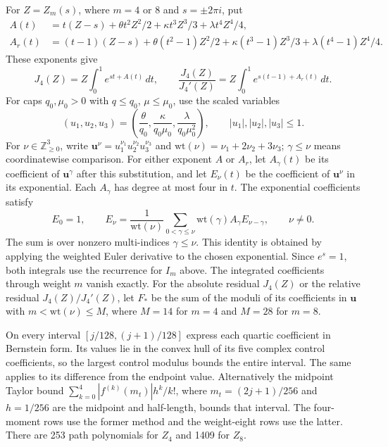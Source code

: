 For $Z=Z_m(s)$, where $m=4$ or $8$ and $s=\pm2\pi i$, put
\begin{align*}
 A(t)&=t(Z-s)+\theta t^2 Z^2/2+\kappa t^3Z^3/3+\lambda t^4Z^4/4,\\
 A_r(t)&=(t-1)(Z-s)+\theta(t^2-1)Z^2/2
                  +\kappa(t^3-1)Z^3/3+\lambda(t^4-1)Z^4/4.
\end{align*}
These exponents give
\[
 J_4(Z)=Z\int_0^1e^{st+A(t)}\,dt,\qquad
 \frac{J_4(Z)}{J_4'(Z)}
 =Z\int_0^1e^{s(t-1)+A_r(t)}\,dt.
\]
For caps $q_0,\mu_0>0$ with $q\le q_0$, $\mu\le\mu_0$, use
the scaled variables
\[
 (u_1,u_2,u_3)=
 \left(\frac{\theta}{q_0},\frac{\kappa}{q_0\mu_0},
                         \frac{\lambda}{q_0\mu_0^2}\right),
 \qquad |u_1|,|u_2|,|u_3|\le1.
\]
For $\nu\in\mathbb Z_{\ge0}^3$, write
$\mathbf u^\nu=u_1^{\nu_1}u_2^{\nu_2}u_3^{\nu_3}$ and
$\mathrm{wt}(\nu)=\nu_1+2\nu_2+3\nu_3$; $\gamma\le\nu$ means
coordinatewise comparison. For either exponent $A$ or $A_r$, let
$A_\gamma(t)$ be its coefficient of $\mathbf u^\gamma$ after this
substitution, and let $E_\nu(t)$ be the coefficient of $\mathbf u^\nu$
in its exponential. Each $A_\gamma$ has degree at most four in $t$.
The exponential coefficients satisfy
\begin{equation}\label{lt:euler-recursion}
 E_0=1,\qquad
 E_\nu=\frac1{\mathrm{wt}(\nu)}
       \sum_{0<\gamma\le\nu}\mathrm{wt}(\gamma)A_\gamma E_{\nu-\gamma},
 \qquad \nu\ne0.
\end{equation}
The sum is over nonzero multi-indices $\gamma\le\nu$.
This identity is obtained by applying the weighted Euler derivative to
the chosen exponential. Since $e^s=1$, both integrals use the recurrence
for $I_m$ above. The integrated coefficients through weight $m$ vanish
exactly.
For the absolute residual $J_4(Z)$ or the relative residual
$J_4(Z)/J_4'(Z)$, let $F_*$ be the sum of the moduli of its
coefficients in $\mathbf u$ with $m<\mathrm{wt}(\nu)\le M$,
where $M=14$ for $m=4$ and $M=28$ for $m=8$.

On every interval
$[j/128,(j+1)/128]$ express each quartic coefficient in Bernstein
form. Its values lie in the convex hull of its five complex control
coefficients, so the largest control modulus bounds the entire
interval. The same applies to its difference from the endpoint value.
Alternatively the midpoint Taylor bound
$\sum_{k=0}^4|f^{(k)}(m_t)|h^k/k!$, where
$m_t=(2j+1)/256$ and $h=1/256$ are the midpoint and half-length,
bounds that interval. The four-moment rows use the former method and the
weight-eight rows use the latter. There are 253 path polynomials for
$Z_4$ and 1409 for $Z_8$.

